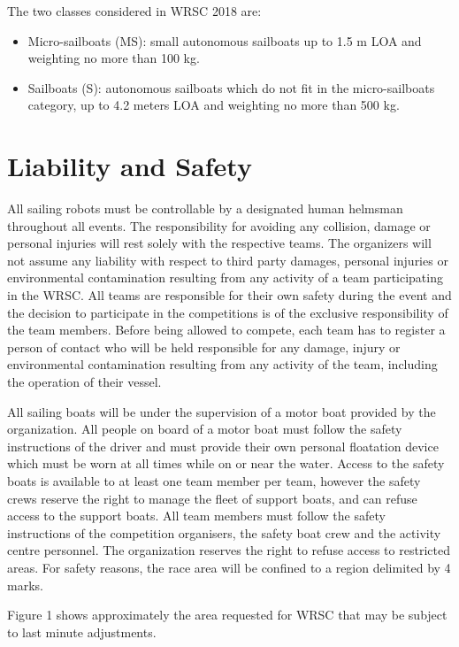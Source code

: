 \documentclass[12pt]{article}
\begin{document}
The two classes considered in WRSC 2018 are:
\begin{itemize}
  \item Micro-sailboats (MS): small autonomous sailboats up to 1.5 m LOA and weighting no more than 100 kg.
  \item Sailboats (S): autonomous sailboats which do not fit in the micro-sailboats category, up to
4.2 meters LOA and weighting no more than 500 kg.
\end{itemize}

\section{Liability and Safety}
All sailing robots must be controllable by a designated human helmsman
throughout all events. The responsibility for avoiding any collision, 
damage or personal injuries will rest solely with the respective teams. 
The organizers will not assume any liability with respect to third party
damages, personal injuries or environmental contamination resulting from any
activity of a team participating in the WRSC. All teams are responsible for 
their own safety during the event and the decision to participate in the 
competitions is of the exclusive responsibility of the team members.
Before being allowed to compete, each team has to register a person of contact
who will be held responsible for any damage, injury or environmental
contamination resulting from any activity of the team, including the 
operation of their vessel.

All sailing boats will be under the supervision of a motor boat provided by the
organization.
All people on board of a motor boat must follow the safety instructions of the driver 
and must provide their own personal floatation device which must be worn at all times 
while on or near the water. Access to the safety boats is available to at least
one team member per team, however the safety crews reserve the
right to manage the fleet of support boats, and can refuse access to the support
boats.
All team members must follow the safety instructions of the competition
organisers, the safety boat crew and the activity centre personnel. The organization
reserves the right to refuse access to restricted areas.
For safety reasons, the race area will be confined to a region delimited by 4
marks. 

Figure 1
shows approximately the area requested for WRSC that may be subject to last
minute adjustments.
\end{document}
